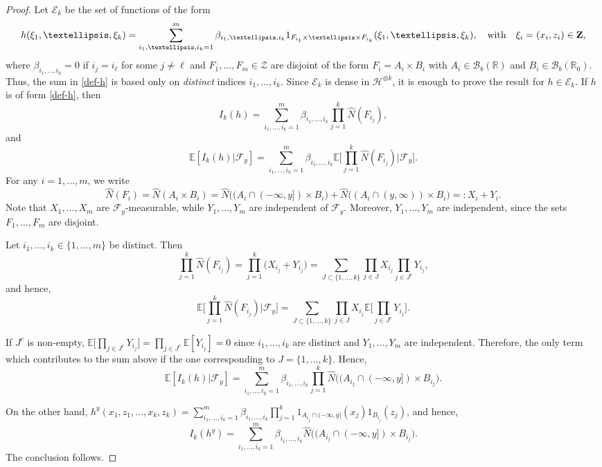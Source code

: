 \documentclass[10pt,a4paper]{amsart}
\def\bE{\mathbb{E}}
\def\bR{\mathbb{R}}
\def\cB{\mathcal{B}}
\def\cE{\mathcal{E}}
\def\cF{\mathcal{F}}
\def\cH{\mathcal{H}}
\def\cZ{\mathcal{Z}}
\begin{document}
\begin{proof}
Let $\cE_k$ be the set of functions of the form
\begin{equation}
\label{def-h}
h(\xi_1,\ldots,\xi_k)=\sum_{i_1,\ldots,i_k=1}^{m}\beta_{i_1,\ldots,i_k} 1_{F_{i_1}\times\ldots \times F_{i_k}}(\xi_1,\ldots,\xi_k), \quad \mbox{with} \quad \xi_i=(x_i,z_i) \in {\bf Z},
\end{equation}
where $\beta_{i_1,\ldots,i_k}=0$ if $i_j=i_{\ell}$ for some $j \not=\ell$ and $F_1,\ldots,F_m\in \cZ$ are disjoint of the form $F_i=A_i \times B_i$ with $A_i \in \cB_b(\bR)$ and $B_i \in \cB_b(\bR_0)$. Thus, the sum in \eqref{def-h} is based only on {\em distinct} indices $i_1,\ldots, i_k$.
Since $\cE_k$ is dense in $\cH^{\otimes k}$,
it is enough to prove the result for $h \in \cE_k$. If $h$ is of form \eqref{def-h}, then
\[
I_k(h)=\sum_{i_1,\ldots,i_k=1}^{m}  \beta_{i_1,\ldots,i_k} \prod_{j=1}^{k}\widehat{N}(F_{i_j}),
\]
and
\[
\bE[I_k(h)|\cF_y]=\sum_{i_1,\ldots,i_k=1}^{m}\beta_{i_1,\ldots,i_k}\bE \Big[\prod_{j=1}^{k} \widehat{N}(F_{i_j}) \big|\cF_y \Big].
\]
For any $i=1,\ldots,m$, we write
\[
\widehat{N}(F_i)=\widehat{N}(A_i \times B_i)=\widehat{N}\big((A_i \cap (-\infty,y]) \times B_i\big)+
\widehat{N}\big((A_i \cap (y,\infty))  \times B_i\big)=:X_i+Y_i.
\]
Note that $X_1,\ldots,X_m$ are $\cF_y$-measurable, while $Y_1,\ldots,Y_m$ are independent of $\cF_y$. Moreover, $Y_1,\ldots,Y_m$ are independent, since the sets $F_1,\ldots,F_m$ are disjoint. 

Let $i_1,\ldots,i_k\in \{1,\ldots,m\}$ be distinct. Then
\[
\prod_{j=1}^{k} \widehat{N}(F_{i_j})=\prod_{j=1}^{k} \big(X_{i_j}+Y_{i_j}\big)=\sum_{J \subset \{1,\ldots,k\}} \prod_{j\in J} X_{i_j} \prod_{j \in J^c} Y_{i_j},
\]
and hence,
\[
\bE\Big[\prod_{j=1}^{k} \widehat{N}(F_{i_j})\big|\cF_y\Big]=\sum_{J \subset \{1,\ldots,k\}} \prod_{j\in J} X_{i_j} \bE\Big[\prod_{j \in J^c} Y_{i_j}\Big].
\]

If $J^c$ is non-empty, $\bE\Big[\prod_{j \in J^c} Y_{i_j}\Big]=\prod_{j \in J^c}\bE[Y_{i_j}]=0$ since $i_1,\ldots, i_k$ are distinct and $Y_1,\ldots,Y_m$ are independent. Therefore, the only term which contributes to the sum above if the one corresponding to $J=\{1,\ldots,k\}$. Hence,
\[
\bE[I_k(h)|\cF_y]=\sum_{i_1,\ldots,i_k=1}^{m}\beta_{i_1,\ldots,i_k}\prod_{j=1}^{k}
\widehat{N}\big((A_{i_j} \cap (-\infty,y]) \times B_{i_j}\big).
\]

On the other hand, $h^y(x_1,z_1,\ldots,x_k,z_k)=\sum_{i_1,\ldots,i_k=1}^{m}\beta_{i_1,\ldots,i_k} 
\prod_{j=1}^{k}1_{A_{i_j} \cap (-\infty,y]}(x_j) 1_{B_{i_j}}(z_j)$,
and hence,
\[
I_k(h^y)=\sum_{i_1,\ldots,i_k=1}^{m}\beta_{i_1,\ldots,i_k}  \widehat{N}\big( (A_{i_j} \cap (-\infty,y]) \times B_{i_j} \big).
\]
The conclusion follows.
\end{proof}
\end{document}
